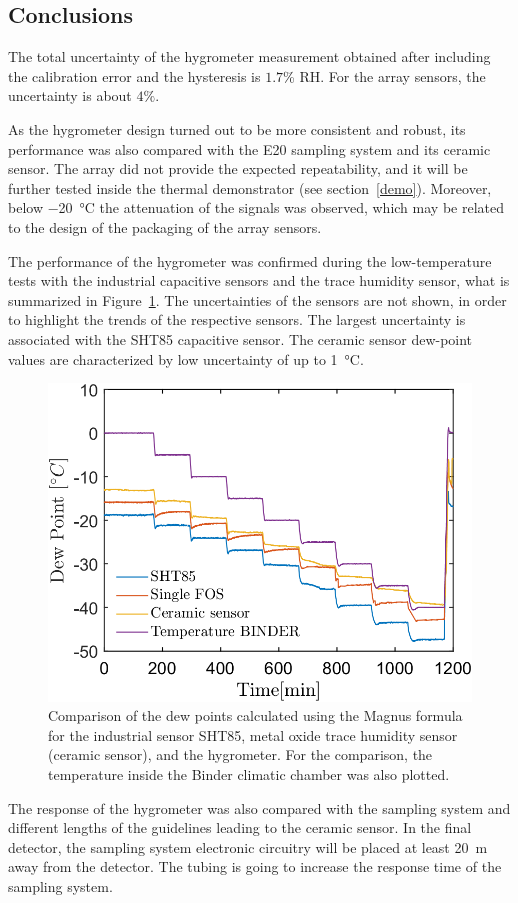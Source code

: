\subsection{Conclusions}
The total uncertainty of the hygrometer measurement obtained after including the calibration error and the hysteresis is $1.7$\% RH. For the array sensors, the uncertainty is about $4\%$.


As the hygrometer design turned out to be more consistent and robust, its performance was also compared with the E20 sampling system\cite{michell_e20} and its ceramic sensor. The array did not provide the expected repeatability, and it  will be further tested inside the thermal demonstrator (see section~\ref{demo}). Moreover, below \SI{-20}{\celsius} the attenuation of the signals was observed, which may be related to the design of the packaging of the array sensors.

The performance of the hygrometer was confirmed during the low-temperature tests with the industrial capacitive sensors and the trace humidity sensor, what is summarized in Figure~\ref{fig_comparison}. The uncertainties of the sensors are not shown, in order to highlight the trends of the respective sensors. The largest uncertainty is associated with the SHT85 capacitive sensor. The ceramic sensor dew-point values are characterized by low uncertainty of up to \SI{1}{\celsius}.  
\begin{figure}[!h]
\centering
\includegraphics[width=0.6\columnwidth]{Chapter5/images/DPCPercent.png}
\caption{Comparison of the dew points calculated using the Magnus formula for the industrial sensor SHT85, metal oxide trace humidity sensor (ceramic sensor), and the hygrometer. For the comparison, the temperature inside the Binder climatic chamber was also plotted.}
\label{fig_comparison}
\end{figure}

The response of the hygrometer was also compared with the sampling system and different lengths of the guidelines leading to the ceramic sensor. In the final detector, the sampling system electronic circuitry will be placed at least \SI{20}{\metre} away from the detector. The tubing is going to increase the response time of the sampling system. 

